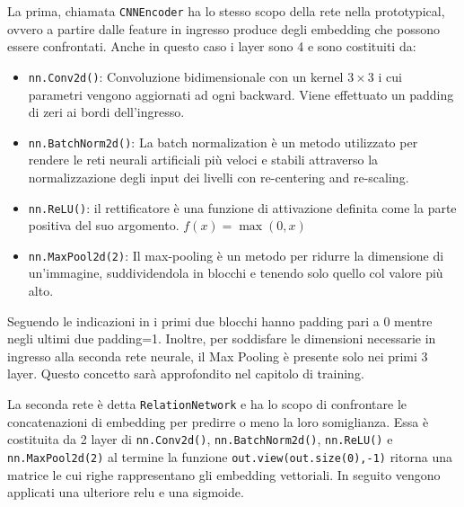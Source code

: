 \documentclass[12pt,a4paper,titlepage]{article}
\begin{document}
La prima, chiamata \texttt{CNNEncoder} ha lo stesso scopo della rete nella prototypical, ovvero a partire dalle feature in ingresso produce degli embedding che possono essere confrontati.
Anche in questo caso i layer sono 4 e sono costituiti da:
\begin{itemize}
	\item \texttt{nn.Conv2d()}: Convoluzione bidimensionale con un kernel $3 \times 3$ i cui parametri vengono aggiornati ad ogni backward. Viene effettuato un padding di zeri ai bordi dell'ingresso.
	\item \texttt{nn.BatchNorm2d()}: La batch normalization è un metodo utilizzato per rendere le reti neurali artificiali più veloci e stabili attraverso la normalizzazione degli input dei livelli con re-centering and re-scaling.
	\item \texttt{nn.ReLU()}: il rettificatore è una funzione di attivazione definita come la parte positiva del suo argomento. $f(x)=\max(0,x)$
	\item \texttt{nn.MaxPool2d(2)}: Il max-pooling è un metodo per ridurre la dimensione di un’immagine, suddividendola in blocchi e tenendo solo quello col valore più alto.
\end{itemize}
Seguendo le indicazioni in \cite{sung:relation} i primi due blocchi hanno padding pari a 0 mentre negli ultimi due padding=1.
Inoltre, per soddisfare le dimensioni necessarie in ingresso alla seconda rete neurale, il Max Pooling è presente solo nei primi 3 layer. Questo concetto sarà approfondito nel capitolo di training.

La seconda rete è detta \texttt{RelationNetwork} e ha lo scopo di confrontare le concatenazioni di embedding per predirre o meno la loro somiglianza.
Essa è costituita da 2 layer di \texttt{nn.Conv2d()}, \texttt{nn.BatchNorm2d()}, \texttt{nn.ReLU()} e \texttt{nn.MaxPool2d(2)} al termine la funzione \texttt{out.view(out.size(0),-1)} ritorna una matrice le cui righe rappresentano gli embedding vettoriali.
In seguito vengono applicati una ulteriore relu e una sigmoide.
\end{document}
